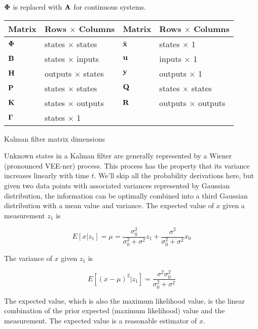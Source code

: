 $\mathbf{\Phi}$ is replaced with $\mathbf{A}$ for continuous systems.

\begin{booktable}
  \begin{tabular}{|ll|ll|}
    \hline
    \rowcolor{headingbg}
    \textbf{Matrix} & \textbf{Rows $\times$ Columns} &
    \textbf{Matrix} & \textbf{Rows $\times$ Columns} \\
    \hline
    $\mathbf{\Phi}$ & states $\times$ states & $\hat{\mathbf{x}}$ & states $\times$ 1
      \\
    $\mathbf{B}$ & states $\times$ inputs & $\mathbf{u}$ & inputs $\times$ 1 \\
    $\mathbf{H}$ & outputs $\times$ states & $\mathbf{y}$ & outputs $\times$ 1 \\
    $\mathbf{P}$ & states $\times$ states & $\mathbf{Q}$ & states $\times$ states \\
    $\mathbf{K}$ & states $\times$ outputs & $\mathbf{R}$ & outputs $\times$ outputs
      \\
    $\mathbf{\Gamma}$ & states $\times$ 1 &  &  \\
    \hline
  \end{tabular}
  \caption{Kalman filter matrix dimensions}
  \label{tab:kf_matrix_dims}
\end{booktable}

Unknown states in a Kalman filter are generally represented by a Wiener
(pronounced VEE-ner) process. This process has the property that its variance
increases linearly with time $t$. We'll skip all the probability derivations
here, but given two data points with associated variances represented by
Gaussian distribution, the information can be optimally combined into a third
Gaussian distribution with a mean value and variance. The expected value of $x$
given a measurement $z_1$ is

\begin{equation}
  E[x|z_1] = \mu = \frac{\sigma_0^2}{\sigma_0^2 + \sigma^2}z_1 +
    \frac{\sigma^2}{\sigma_0^2 + \sigma^2}x_0
\end{equation}

The variance of $x$ given $z_1$ is

\begin{equation}
  E[(x - \mu)^2|z_1] = \frac{\sigma^2 \sigma_0^2}{\sigma_0^2 + \sigma^2}
\end{equation}

The expected value, which is also the maximum likelihood value, is the linear
combination of the prior expected (maximum likelihood) value and the
measurement. The expected value is a reasonable estimator of $x$.

